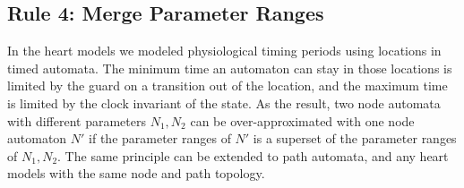 %
%
\subsection{Rule 4: Merge Parameter Ranges}
In the heart models we modeled physiological timing periods using locations in timed automata. The minimum time an automaton can stay in those locations is limited by the guard on a transition out of the location, and the maximum time is limited by the clock invariant of the state. As the result, two node automata with different parameters $N_1,N_2$ can be over-approximated with one node automaton $N'$ if the parameter ranges of $N'$ is a superset of the parameter ranges of $N_1,N_2$. The same principle can be extended to path automata, and any heart models with the same node and path topology.

